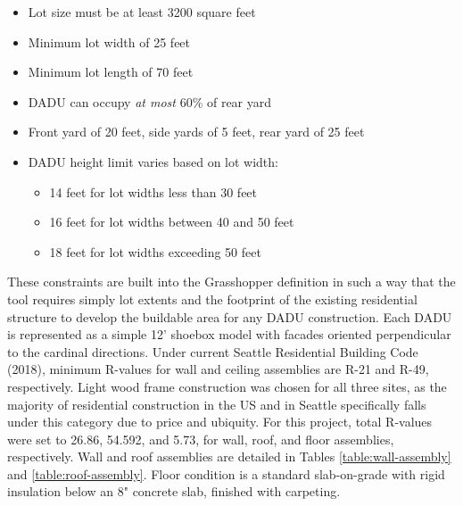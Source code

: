 \documentclass[sagev,times,Review,doublespace]{sagej}
\begin{document}
\begin{itemize}
	\item Lot size must be at least 3200 square feet
	\item Minimum lot width of 25 feet
	\item Minimum lot length of 70 feet
	\item DADU can occupy \textit{at most} 60\% of rear yard	
	\item Front yard of 20 feet, side yards of 5 feet, rear yard of 25  feet
	\item DADU height limit varies based on lot width: \begin{itemize}
	\item 14 feet for lot widths less than 30 feet
	\item 16 feet for lot widths between 40 and 50 feet
	\item 18 feet for lot widths exceeding 50 feet \end{itemize}
\label{zoning-restrictions}
\end{itemize}

These constraints are built into the Grasshopper definition in such a way that the tool requires simply lot extents and the footprint of the existing residential structure to develop the buildable area for any DADU construction. Each DADU is represented as a simple 12' shoebox model with facades oriented  perpendicular to the cardinal directions. Under current Seattle Residential Building Code (2018), minimum R-values for wall and ceiling assemblies are R-21 and R-49, respectively. Light wood frame construction was chosen for all three sites, as the majority of residential construction in the US and in Seattle specifically falls under this category due to price and ubiquity. For this project, total R-values were set to 26.86, 54.592, and 5.73, for wall, roof, and floor assemblies, respectively. Wall and roof assemblies are detailed in Tables \ref{table:wall-assembly} and \ref{table:roof-assembly}. Floor condition is a standard slab-on-grade with rigid insulation below an 8" concrete slab, finished with carpeting.
\end{document}
